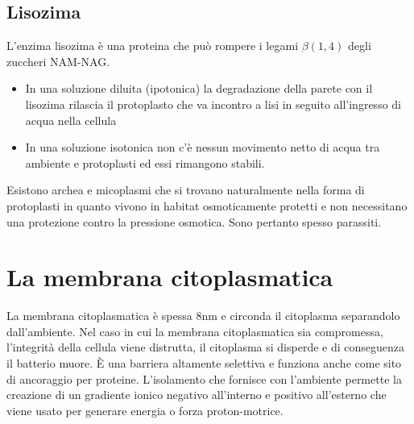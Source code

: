 \subsection{Lisozima}
L’enzima lisozima è una proteina che può rompere i legami $\beta(1, 4)$ degli zuccheri NAM-NAG.
\begin{itemize}
\item In una soluzione diluita (ipotonica) la degradazione della parete con il lisozima rilascia il protoplasto che va incontro a lisi in seguito
all’ingresso di acqua nella cellula
\item In una soluzione isotonica non c’è nessun movimento netto di acqua tra ambiente e protoplasti ed essi rimangono stabili.
\end{itemize}
Esistono archea e micoplasmi che si trovano naturalmente nella forma di protoplasti in quanto vivono in habitat osmoticamente protetti e non necessitano una protezione contro la
pressione osmotica. Sono pertanto spesso parassiti.
\section{La membrana citoplasmatica}
La membrana citoplasmatica \`e spessa $8\si{\nano\metre}$ e circonda il citoplasma separandolo dall’ambiente. Nel caso in cui la membrana citoplasmatica sia compromessa, l’integrità
della cellula viene distrutta, il citoplasma si disperde e di conseguenza il batterio muore. \`E una barriera altamente selettiva e funziona anche come sito di ancoraggio per proteine.
L'isolamento che fornisce con l'ambiente permette la creazione di un gradiente ionico negativo all'interno e positivo all'esterno che viene usato per generare energia o forza
proton-motrice.
